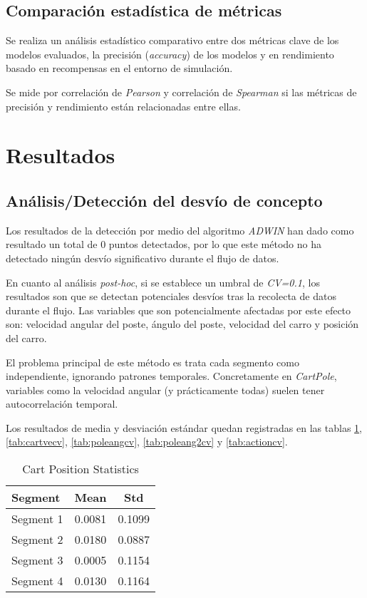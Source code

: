 \documentclass[12pt,letterpaper]{article}
\begin{document}
\subsection{Comparación estadística de métricas}
Se realiza un análisis estadístico comparativo entre dos métricas clave de los modelos evaluados, la precisión (\textit{accuracy}) de los modelos y en rendimiento basado en recompensas en el entorno de simulación.

Se mide por correlación de \textit{Pearson} \cite{pearson1895vii} y correlación de \textit{Spearman} \cite{spearman1904proof} si las métricas de precisión y rendimiento están relacionadas entre ellas.

\section{Resultados}

\subsection{Análisis/Detección del desvío de concepto}
Los resultados de la detección por medio del algoritmo \textit{ADWIN} han dado como resultado un total de $0$ puntos detectados, por lo que este método no ha detectado ningún desvío significativo durante el flujo de datos.

En cuanto al análisis \textit{post-hoc}, si se establece un umbral de \textit{CV=0.1}, los resultados son que se detectan potenciales desvíos tras la recolecta de datos durante el flujo. Las variables que son potencialmente afectadas por este efecto son: velocidad angular del poste, ángulo del poste, velocidad del carro y posición del carro.

El problema principal de este método es trata cada segmento como independiente, ignorando patrones temporales. Concretamente en \textit{CartPole}, variables como la velocidad angular (y prácticamente todas) suelen tener autocorrelación temporal.

Los resultados de media y desviación estándar quedan registradas en las tablas \ref{tab:cartpocv}, \ref{tab:cartvecv}, \ref{tab:poleangcv}, \ref{tab:poleang2cv} y \ref{tab:actioncv}.

\begin{table}[htp]
    \centering
    \begin{tabular}{lcc}
        \toprule
        Segment   & Mean   & Std    \\
        \midrule
        Segment 1 & 0.0081 & 0.1099 \\
        Segment 2 & 0.0180 & 0.0887 \\
        Segment 3 & 0.0005 & 0.1154 \\
        Segment 4 & 0.0130 & 0.1164 \\
        \bottomrule
    \end{tabular}
    \caption{Cart Position Statistics}
    \label{tab:cartpocv}
\end{table}
\end{document}

